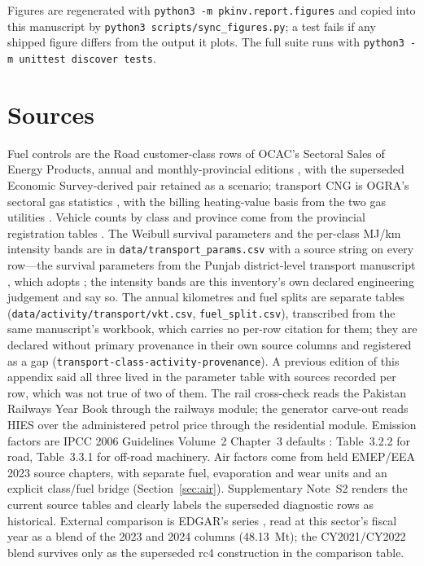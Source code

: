 Figures are regenerated with \texttt{python3 -m pkinv.report.figures} and copied into this
manuscript by \texttt{python3 scripts/sync\_figures.py}; a test fails if any shipped figure
differs from the output it plots. The full suite runs with
\texttt{python3 -m unittest discover tests}.

\section{Sources}
\label{app:sources}

Fuel controls are the Road customer-class rows of OCAC's Sectoral Sales of Energy
Products, annual and monthly-provincial editions \citep{ocacarchive}, with the superseded
Economic Survey-derived pair \citep{econsurvey2025energy} retained as a scenario;
transport CNG is OGRA's sectoral gas statistics \citep{ogra2024,ograarchive}, with the
billing heating-value basis from the two gas utilities \citep{sngpl2024,ssgc2024}.
Vehicle counts by class and province come from the provincial registration tables
\citep{provregstats}. The Weibull survival parameters and the per-class MJ/km intensity
bands are in \texttt{data/transport\_params.csv} with a source string on every row---the
survival parameters from the Punjab district-level transport manuscript
\citep{naveedpunjab}, which adopts \citet{guttikunda2024}; the intensity bands are this
inventory's own declared engineering judgement and say so. The annual kilometres and fuel
splits are separate tables (\texttt{data/activity/transport/vkt.csv},
\texttt{fuel\_split.csv}), transcribed from the same manuscript's workbook, which carries
no per-row citation for them; they are declared without primary provenance in their own
source columns and registered as a gap
(\texttt{transport-class-activity-provenance}). A previous edition of this appendix said
all three lived in the parameter table with sources recorded per row, which was not true
of two of them. The rail cross-check reads the
Pakistan Railways Year Book \citep{pakrailyearbook2024} through the railways module; the
generator carve-out reads HIES \citep{hies2025} over the administered petrol price
\citep{goppetrol} through the residential module. Emission factors are
IPCC 2006 Guidelines Volume~2 Chapter~3 defaults \citep{ipcc2006energy}: Table~3.2.2 for
road, Table~3.3.1 for off-road machinery. Air factors come from held EMEP/EEA 2023 source chapters, with separate fuel, evaporation and wear units and an explicit class/fuel bridge (Section~\ref{sec:air}). Supplementary Note~S2 renders the current source tables and clearly labels the superseded diagnostic rows as historical. External
comparison is EDGAR's series \citep{edgar2025booklet}, read at this sector's fiscal
year as a blend of the 2023 and 2024 columns (\SI{48.13}{\mega\tonne}); the
CY2021/CY2022 blend survives only as the superseded rc4 construction in the
comparison table.

